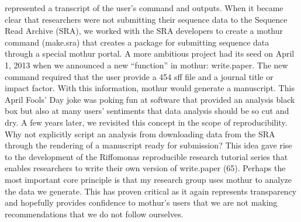 \documentclass[11pt,]{article}
\begin{document}
represented a transcript of the user's command and outputs. When it
became clear that researchers were not submitting their sequence data to
the Sequence Read Archive (SRA), we worked with the SRA developers to
create a mothur command (make.sra) that creates a package for submitting
sequence data through a special mothur portal. A more ambitious project
had its seed on April 1, 2013 when we announced a new ``function'' in
mothur: write.paper. The new command required that the user provide a
454 sff file and a journal title or impact factor. With this
information, mothur would generate a manuscript. This April Fools' Day
joke was poking fun at software that provided an analysis black box but
also at many users' sentiments that data analysis should be so cut and
dry. A few years later, we revisited this concept in the scope of
reproducibility. Why not explicitly script an analysis from downloading
data from the SRA through the rendering of a manuscript ready for
submission? This idea gave rise to the development of the Riffomonas
reproducible research tutorial series that enables researchers to write
their own version of write.paper (65). Perhaps the most important core
principle is that my research group uses mothur to analyze the data we
generate. This has proven critical as it again represents transparency
and hopefully provides confidence to mothur's users that we are not
making recommendations that we do not follow ourselves.
\end{document}
